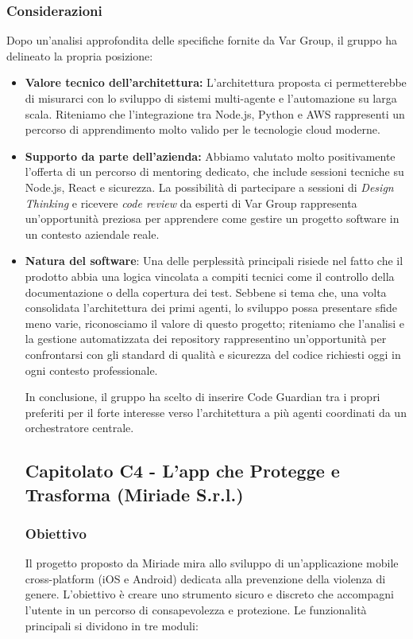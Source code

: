 \documentclass[a4paper, 10pt, colorlinks=true, linkcolor=black, urlcolor=blue, citecolor=blue, hidelinks]{article}
\begin{document}
\subsubsection{Considerazioni}
Dopo un'analisi approfondita delle specifiche fornite da Var Group, il gruppo ha delineato la propria posizione:

\begin{itemize}
    \item \textbf{Valore tecnico dell'architettura:} L'architettura proposta ci permetterebbe di misurarci con lo sviluppo di sistemi multi-agente e l'automazione su larga scala. Riteniamo che l'integrazione tra Node.js, Python e AWS rappresenti un percorso di apprendimento molto valido per le tecnologie cloud moderne.
    \item \textbf{Supporto da parte dell'azienda:} Abbiamo valutato molto positivamente l'offerta di un percorso di mentoring dedicato, che include sessioni tecniche su Node.js, React e sicurezza. La possibilità di partecipare a sessioni di \textit{Design Thinking} e ricevere \textit{code review} da esperti di Var Group rappresenta un'opportunità preziosa per apprendere come gestire un progetto software in un contesto aziendale reale.
    \item \textbf{Natura del software}: Una delle perplessità principali risiede nel fatto che il prodotto abbia una logica vincolata a compiti tecnici come il controllo della documentazione o della copertura dei test. Sebbene si tema che, una volta consolidata l’architettura dei primi agenti, lo sviluppo possa presentare sfide meno varie, riconosciamo il valore di questo progetto; riteniamo che l’analisi e la gestione automatizzata dei repository rappresentino un’opportunità per confrontarsi con gli standard di qualità e sicurezza del codice richiesti oggi in ogni contesto professionale.

In conclusione, il gruppo ha scelto di inserire Code Guardian tra i propri preferiti per il forte interesse verso l'architettura a più agenti coordinati da un orchestratore centrale.

\subsection{Capitolato C4 - L'app che Protegge e Trasforma (Miriade S.r.l.)}

\subsubsection{Obiettivo}
Il progetto proposto da Miriade mira allo sviluppo di un'applicazione mobile cross-platform (iOS e Android) dedicata alla prevenzione della violenza di genere. L'obiettivo è creare uno strumento sicuro e discreto che accompagni l'utente in un percorso di consapevolezza e protezione. Le funzionalità principali si dividono in tre moduli:


\end{itemize}
\end{document}
